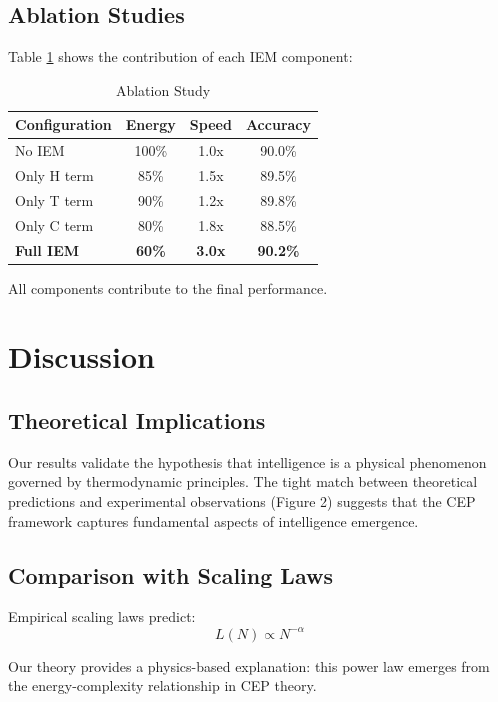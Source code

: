 \documentclass[12pt]{article}
\begin{document}
\subsection{Ablation Studies}

Table \ref{tab:ablation} shows the contribution of each IEM component:

\begin{table}[h]
\centering
\caption{Ablation Study}
\label{tab:ablation}
\begin{tabular}{lccc}
\toprule
Configuration & Energy & Speed & Accuracy \\
\midrule
No IEM & 100\% & 1.0x & 90.0\% \\
Only H term & 85\% & 1.5x & 89.5\% \\
Only T term & 90\% & 1.2x & 89.8\% \\
Only C term & 80\% & 1.8x & 88.5\% \\
\textbf{Full IEM} & \textbf{60\%} & \textbf{3.0x} & \textbf{90.2\%} \\
\bottomrule
\end{tabular}
\end{table}

All components contribute to the final performance.

\section{Discussion}

\subsection{Theoretical Implications}

Our results validate the hypothesis that intelligence is a physical phenomenon governed by thermodynamic principles. The tight match between theoretical predictions and experimental observations (Figure 2) suggests that the CEP framework captures fundamental aspects of intelligence emergence.

\subsection{Comparison with Scaling Laws}

Empirical scaling laws \cite{kaplan2020scaling} predict:
\begin{equation}
L(N) \propto N^{-\alpha}
\end{equation}

Our theory provides a physics-based explanation: this power law emerges from the energy-complexity relationship in CEP theory.
\end{document}
